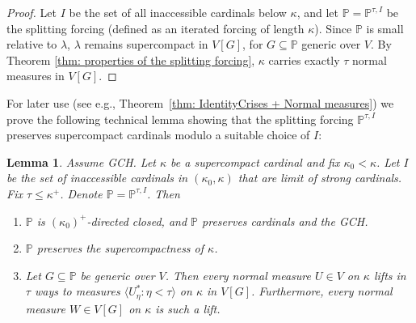 \documentclass[11pt]{amsart}
\newtheorem{lemma}[theorem]{Lemma}
\theoremstyle{definition}
\theoremstyle{remark}
\newcommand\<{{<}}
\newcommand{\po}{\mathbb{P}}
\newcommand{\la}{\langle}
\newcommand{\ra}{\rangle}
\begin{document}
    \begin{proof}
        Let $I$ be the set of all inaccessible cardinals below $\kappa$, and let $\po = \po^{\tau,I}$ be the splitting forcing (defined as an iterated forcing of length $\kappa$). Since $\po$ is small relative to $\lambda$, $\lambda$ remains  supercompact  in $V[G]$, for $G\subseteq \po$ generic over $V$. By Theorem \ref{thm: properties of the splitting forcing}, $\kappa$ carries exactly $\tau$ normal measures in $V[G]$.
    \end{proof}
For later use (see e.g., Theorem~\ref{thm: IdentityCrises + Normal measures})  we prove the following technical lemma showing that the splitting forcing $\mathbb{P}^{\tau,I}$ preserves supercompact cardinals modulo a suitable choice of $I$:
\begin{lemma}\label{lemma: the spaced splitting forcing preserves supercompactness}
        Assume {\rm{GCH}}. Let $\kappa$ be a supercompact cardinal and fix $\kappa_0 < \kappa$. Let $I$ be the set of inaccessible cardinals in $(\kappa_{0},\kappa)$ that are limit of strong cardinals. Fix $\tau\leq \kappa^+$. Denote $\po = \mathbb{P}^{\tau,I}$. Then 
        \begin{enumerate}
            \item \label{Clause: spaced splitting forcing 1} $\po$ is $(\kappa_0)^+$-directed closed, and $\po$ preserves cardinals and the {\rm{GCH}}.
            \item \label{Clause: spaced splitting forcing 2} $\po$ preserves the supercompactness of $\kappa$.
            \item \label{Clause: spaced splitting forcing 3} Let $G\subseteq \po$ be generic over $V$. Then every normal measure $U\in V$ on $\kappa$ lifts in $\tau$ ways to measures $\la U^*_\eta \colon \eta<\tau \ra$ on $\kappa$ in $V[G]$. Furthermore, every normal measure $W\in V[G]$ on $\kappa$ is such a lift.
        \end{enumerate}
    \end{lemma}
\end{document}
